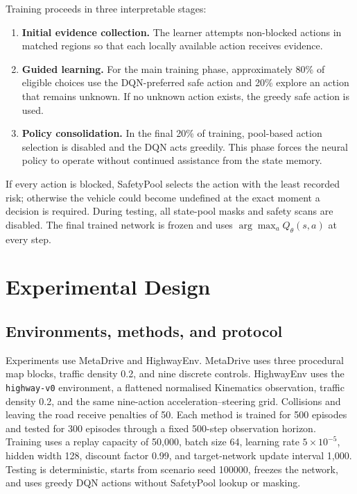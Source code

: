 \documentclass[runningheads]{llncs}
\begin{document}
Training proceeds in three interpretable stages:

\begin{enumerate}[leftmargin=*]
\item \textbf{Initial evidence collection.} The learner attempts non-blocked actions in matched regions so that each locally available action receives evidence.
\item \textbf{Guided learning.} For the main training phase, approximately 80\% of eligible choices use the DQN-preferred safe action and 20\% explore an action that remains unknown. If no unknown action exists, the greedy safe action is used.
\item \textbf{Policy consolidation.} In the final 20\% of training, pool-based action selection is disabled and the DQN acts greedily. This phase forces the neural policy to operate without continued assistance from the state memory.
\end{enumerate}

If every action is blocked, SafetyPool selects the action with the least recorded risk; otherwise the vehicle could become undefined at the exact moment a decision is required. During testing, all state-pool masks and safety scans are disabled. The final trained network is frozen and uses $\arg\max_a Q_\theta(s,a)$ at every step.

\section{Experimental Design}

\subsection{Environments, methods, and protocol}

Experiments use MetaDrive \cite{li2023metadrive} and HighwayEnv. MetaDrive uses three procedural map blocks, traffic density 0.2, and nine discrete controls. HighwayEnv uses the \texttt{highway-v0} environment, a flattened normalised Kinematics observation, traffic density 0.2, and the same nine-action acceleration--steering grid. Collisions and leaving the road receive penalties of 50. Each method is trained for 500 episodes and tested for 300 episodes through a fixed 500-step observation horizon. Training uses a replay capacity of 50,000, batch size 64, learning rate $5\times10^{-5}$, hidden width 128, discount factor 0.99, and target-network update interval 1,000. Testing is deterministic, starts from scenario seed 100000, freezes the network, and uses greedy DQN actions without SafetyPool lookup or masking.
\end{document}
